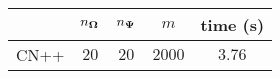 \centering
\renewcommand{\arraystretch}{1.2}
\begin{tabular}{@{}lcccc@{}}
\toprule
 & $n_{\boldsymbol{\Omega}}$ & $n_{\boldsymbol{\Psi}}$ & $m$ & time (s)\\
\midrule
CN++ & $20$ & $20$ & $2000$ & $3.76$ \\
\bottomrule
\end{tabular}
